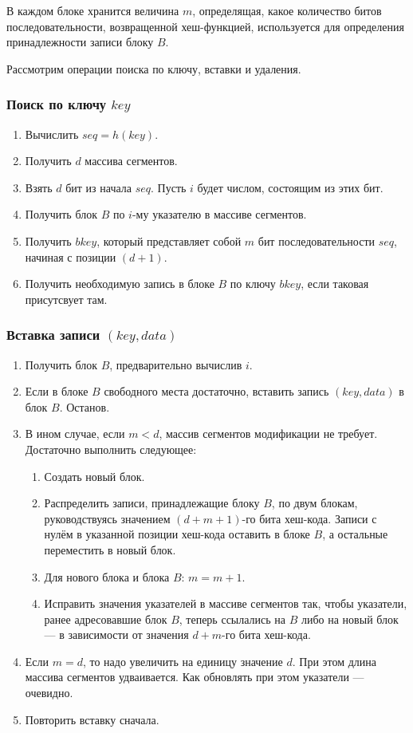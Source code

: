 В каждом блоке хранится величина $m$, определящая, какое количество битов последовательности, возвращенной хеш-функцией, используется для определения принадлежности записи блоку $B$.

Рассмотрим операции поиска по ключу, вставки и удаления.

\subsubsection{Поиск по ключу $key$}
\begin{enumerate}
  \item Вычислить $seq = h(key)$.
  \item Получить $d$ массива сегментов.
  \item Взять $d$ бит из начала $seq$. Пусть $i$ будет числом, состоящим из этих бит.
  \item Получить блок $B$ по $i$-му указателю в массиве сегментов.
  \item Получить $bkey$, который представляет собой $m$ бит последовательности $seq$, начиная с позиции $(d + 1)$.
  \item Получить необходимую запись в блоке $B$ по ключу $bkey$, если таковая присутсвует там.
\end{enumerate}

\subsubsection{Вставка записи $(key, data)$}

\begin{enumerate}
  \item Получить блок $B$, предварительно вычислив $i$.
  \item Если в блоке $B$ свободного места достаточно, вставить запись $(key, data)$ в блок $B$. Останов.
  \item В ином случае, если $m < d$, массив сегментов модификации не требует. Достаточно выполнить следующее:
    \begin{enumerate}
      \item Создать новый блок.
      \item Распределить записи, принадлежащие блоку $B$, по двум блокам, руководствуясь значением $(d + m + 1)$-го бита хеш-кода. Записи с нулём в указанной позиции хеш-кода оставить в блоке $B$, а остальные переместить в новый блок.
      \item Для нового блока и блока $B$: $m = m + 1$.
      \item Исправить значения указателей в массиве сегментов так, чтобы указатели, ранее адресовавшие блок $B$, теперь ссылались на $B$ либо на новый блок — в зависимости от значения $d + m$-го бита хеш-кода.
    \end{enumerate}

  \item Если $m = d$, то надо увеличить на единицу значение $d$. При этом длина массива сегментов удваивается. Как обновлять при этом указатели — очевидно.
  \item Повторить вставку сначала.
\end{enumerate}

